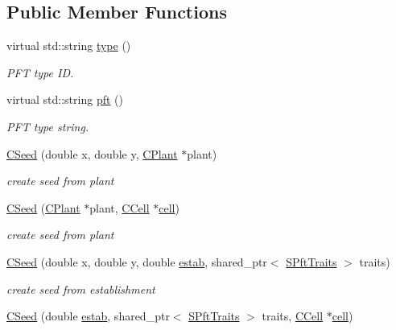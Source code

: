 \subsection*{Public Member Functions}
\begin{DoxyCompactItemize}
\item 
virtual std\+::string \mbox{\hyperlink{class_c_seed_a0e10c5ee3d7a6bf14226de5a5728b2a4}{type}} ()
\begin{DoxyCompactList}\small\item\em P\+FT type ID. \end{DoxyCompactList}\item 
virtual std\+::string \mbox{\hyperlink{class_c_seed_a6e0601a2fd06a652e34e57916dbdacb9}{pft}} ()
\begin{DoxyCompactList}\small\item\em P\+FT type string. \end{DoxyCompactList}\item 
\mbox{\hyperlink{class_c_seed_a9d8bb7aa1750b4e2fe36fced4178ced1}{C\+Seed}} (double x, double y, \mbox{\hyperlink{class_c_plant}{C\+Plant}} $\ast$plant)
\begin{DoxyCompactList}\small\item\em create seed from plant \end{DoxyCompactList}\item 
\mbox{\hyperlink{class_c_seed_a8dd3a324256d2e93c8d9d19cf764a00d}{C\+Seed}} (\mbox{\hyperlink{class_c_plant}{C\+Plant}} $\ast$plant, \mbox{\hyperlink{class_c_cell}{C\+Cell}} $\ast$\mbox{\hyperlink{class_c_seed_a93f258be6fe7841d52daa4e9e362c00e}{cell}})
\begin{DoxyCompactList}\small\item\em create seed from plant \end{DoxyCompactList}\item 
\mbox{\hyperlink{class_c_seed_af06007d535b031246ea2b1af0ce78aa7}{C\+Seed}} (double x, double y, double \mbox{\hyperlink{class_c_seed_ae9b71bc4ff10218aade80211c89fedaf}{estab}}, shared\+\_\+ptr$<$ \mbox{\hyperlink{class_s_pft_traits}{S\+Pft\+Traits}} $>$ traits)
\begin{DoxyCompactList}\small\item\em create seed from establishment \end{DoxyCompactList}\item 
\mbox{\hyperlink{class_c_seed_a0eb923b3779ba947b2fc7a5bb1a36fa8}{C\+Seed}} (double \mbox{\hyperlink{class_c_seed_ae9b71bc4ff10218aade80211c89fedaf}{estab}}, shared\+\_\+ptr$<$ \mbox{\hyperlink{class_s_pft_traits}{S\+Pft\+Traits}} $>$ traits, \mbox{\hyperlink{class_c_cell}{C\+Cell}} $\ast$\mbox{\hyperlink{class_c_seed_a93f258be6fe7841d52daa4e9e362c00e}{cell}})

\end{DoxyCompactItemize}

